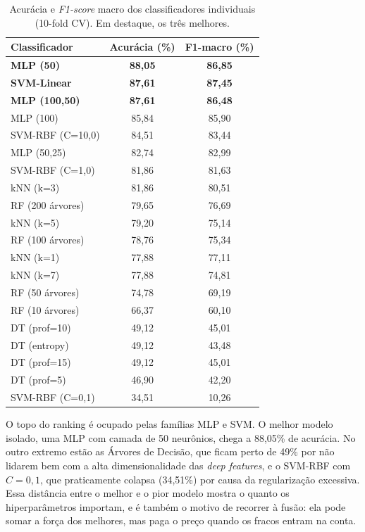 \documentclass[12pt]{article}
\begin{document}
\begin{table}[H]
\centering
\caption{Acurácia e \textit{F1-score} macro dos classificadores individuais
(10-fold CV). Em destaque, os três melhores.}
\label{tab:ind}
\begin{tabular}{lcc}
\toprule
Classificador & Acurácia (\%) & F1-macro (\%) \\
\midrule
\textbf{MLP (50)}      & \textbf{88,05} & \textbf{86,85} \\
\textbf{SVM-Linear}    & \textbf{87,61} & \textbf{87,45} \\
\textbf{MLP (100,50)}  & \textbf{87,61} & \textbf{86,48} \\
MLP (100)              & 85,84 & 85,90 \\
SVM-RBF (C=10,0)       & 84,51 & 83,44 \\
MLP (50,25)            & 82,74 & 82,99 \\
SVM-RBF (C=1,0)        & 81,86 & 81,63 \\
kNN (k=3)              & 81,86 & 80,51 \\
RF (200 árvores)       & 79,65 & 76,69 \\
kNN (k=5)              & 79,20 & 75,14 \\
RF (100 árvores)       & 78,76 & 75,34 \\
kNN (k=1)              & 77,88 & 77,11 \\
kNN (k=7)              & 77,88 & 74,81 \\
RF (50 árvores)        & 74,78 & 69,19 \\
RF (10 árvores)        & 66,37 & 60,10 \\
DT (prof=10)           & 49,12 & 45,01 \\
DT (entropy)           & 49,12 & 43,48 \\
DT (prof=15)           & 49,12 & 45,01 \\
DT (prof=5)            & 46,90 & 42,20 \\
SVM-RBF (C=0,1)        & 34,51 & 10,26 \\
\bottomrule
\end{tabular}
\end{table}

O topo do ranking é ocupado pelas famílias MLP e SVM. O melhor modelo isolado,
uma MLP com camada de 50 neurônios, chega a 88,05\% de acurácia. No outro
extremo estão as Árvores de Decisão, que ficam perto de 49\% por não lidarem bem
com a alta dimensionalidade das \textit{deep features}, e o SVM-RBF com
$C=0{,}1$, que praticamente colapsa (34,51\%) por causa da regularização
excessiva. Essa distância entre o melhor e o pior modelo mostra o quanto os
hiperparâmetros importam, e é também o motivo de recorrer à fusão: ela pode somar
a força dos melhores, mas paga o preço quando os fracos entram na conta.
\end{document}
